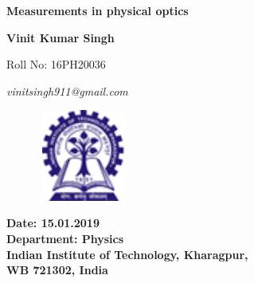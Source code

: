 \documentclass[12pt]{report}
\begin{document}
\thispagestyle{empty}

\begin{center}
	{\Huge \bf Measurements in physical optics}
\end{center}
\vspace{0.5cm}
{\par}
{\par}

\vspace{5.5cm}

{\centering \textbf{\Large Vinit Kumar Singh}\par}
{\centering \large Roll No: 16PH20036 \par}
{\centering \large \em vinitsingh911@gmail.com \par}

\vspace{3.0cm}

\begin{figure}[h]
	\centering
	\includegraphics[height=3cm,width=3cm]{IIT_Logo.png}
\end{figure}


\begin{center}
	{\textbf{Date: 15.01.2019} \\
		\textbf{Department: Physics} \\
		\textbf{Indian Institute of Technology, Kharagpur,}\\
		\textbf {WB 721302, India}\\

	}
\end{center}
\newpage
\tableofcontents

\newpage
\end{document}
